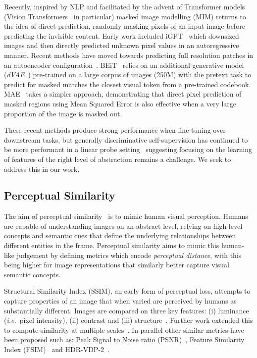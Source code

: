 \documentclass[10pt,twocolumn,letterpaper, cta-author]{article}
\begin{document}
Recently, inspired by NLP and facilitated by the advent of Transformer models (Vision Transformers~\cite{50650} in particular) masked image modelling (MIM) returns to the idea of direct-prediction, randomly masking pixels of an input image before predicting the invisible content. Early work included iGPT~\cite{pmlr-v119-chen20s} which downsized images and then directly predicted unknown pixel values in an autoregressive manner. Recent methods have moved towards predicting full resolution patches in an autoencoder configuration~\cite{bao2022beit, MaskedAutoencoders2021, Xie_2022_CVPR}. BEiT~\cite{bao2022beit} relies on an additional generative model (\textit{dVAE}~\cite{pmlr-v139-ramesh21a}) pre-trained on a large corpus of images (250M) with the pretext task to predict for masked matches the closest visual token from a pre-trained codebook. MAE~\cite{MaskedAutoencoders2021} takes a simpler approach, demonstrating that direct pixel prediction of masked regions using Mean Squared Error is also effective when a very large proportion of the image is masked out.

These recent methods produce strong performance when fine-tuning over downstream tasks, but generally discriminative self-supervision has continued to be more performant in a linear probe setting~\cite{MaskedAutoencoders2021} suggesting focusing on the learning of features of the right level of abstraction remains a challenge. We seek to address this in our work.

\subsection{Perceptual Similarity} \label{sec:perceptual}

The aim of perceptual similarity~\cite{zhang2018perceptual} is to mimic human visual perception. Humans are capable of understanding images on an abstract level, relying on high level concepts and semantic cues that define the underlying relationships between different entities in the frame. Perceptual similarity aims to mimic this human-like judgement by defining metrics which encode \textit{perceptual distance}, with this being higher for image representations that similarly better capture visual semantic concepts.

Structural Similarity Index (SSIM), an early form of perceptual loss, attempts to capture properties of an image that when varied are perceived by humans as substantially different. Images are compared on three key features: (i) luminance (\textit{i.e.}\ pixel intensity), (ii) contrast and (iii) structure~\cite{journals/tip/WangBSS04}. Further work extended this to compute similarity at multiple scales~\cite{1292216}. In parallel other similar metrics have been proposed such as: Peak Signal to Noise ratio (PSNR)~\cite{5596999}, Feature Similarity Index (FSIM)~\cite{5705575} and HDR-VDP-2~\cite{10.1145/2010324.1964935}.
\end{document}
